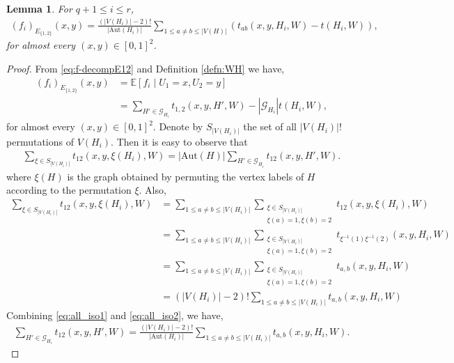 \documentclass[11pt,reqno]{amsart}
\numberwithin{equation}{section}
\newcommand\Aut{\mathrm{Aut}}
\newtheorem{lemma}{Lemma}[section]
\theoremstyle{definition}
\begin{document}
\begin{lemma}\label{lemma:f_E12-expression}
For $q+1\leq i\leq r$,
\begin{align*}
    (f_{i})_{E_{\{1,2\}}}(x,y) = \frac{(|V(H_{i})|-2)!}{|\Aut(H_{i})|}\sum_{1 \leq a\neq b \leq |V(H)|}\left(t_{ab}(x,y,H_{i},W) - t(H_{i},W)\right) , 
\end{align*}
for almost every $(x,y)\in [0,1]^{2}$.
\end{lemma}
\begin{proof}
From \eqref{eq:f-decompE12} and Definition \ref{defn:WH} we have,  
\begin{align}\label{eq:f_E12-1}
    (f_{i})_{E_{\{1,2\}}}(x,y)
    & = \mathbb{E}\left[f_{i}\middle| U_{1}=x,U_{2}=y\right]\nonumber\\
    & = \sum_{H'\in \mathscr{G}_{H_{i}}}t_{1,2}\left(x,y,H',W\right) - |\mathscr{G}_{H_{i}}|t(H_{i},W) , 
\end{align}
for almost every $(x,y)\in [0,1]^2$. Denote by $S_{|V(H_{i})|}$ the set of all $|V(H_{i})|!$ permutations of $V(H_{i})$. 
Then it is easy to observe that 
\begin{align}\label{eq:all_iso1}
    \sum_{\xi\in S_{|V(H_{i})|}}t_{12}(x,y,\xi(H_{i}),W)=|\Aut(H)|\sum_{H'\in\mathscr{G}_{H_{i}}}t_{12}(x,y,H',W).
\end{align}
where $\xi(H)$ is the graph obtained by permuting the vertex labels of $H$ according to the permutation $\xi$. Also,
\begin{align}
    \sum_{\xi\in S_{|V(H_{i})|}}t_{12}(x,y,\xi(H_{i}),W)
    &=\sum_{1\leq a\neq b\leq |V(H_{i})|}\sum_{\substack{\xi\in S_{|V(H_{i})|}\\\xi(a)=1,\xi(b)=2}}t_{12}(x,y,\xi(H_{i}),W)\nonumber\\
    &=\sum_{1\leq a\neq b\leq |V(H_{i})|}\sum_{\substack{\xi\in S_{|V(H_{i})|}\\\xi(a)=1,\xi(b)=2}}t_{\xi^{-1}(1)\xi^{-1}(2)}(x,y,H_{i},W)\nonumber\\
    &=\sum_{1\leq a\neq b\leq |V(H_{i})|}\sum_{\substack{\xi\in S_{|V(H_{i})|}\\\xi(a)=1,\xi(b)=2}}t_{a, b}(x,y,H_{i},W)\nonumber\\
    &=(|V(H_{i})|-2)!\sum_{1\leq a\neq b\leq |V(H_{i})|}t_{a,b}(x,y,H_{i},W)\label{eq:all_iso2}
\end{align}
Combining \eqref{eq:all_iso1} and \eqref{eq:all_iso2}, we have,
\begin{align}\label{eq:WH_alt}
    \sum_{H'\in\mathscr{G}_{H_{i}}}t_{12}(x,y,H',W)=\frac{(|V(H_{i})|-2)!}{|\Aut(H_{i})|}\sum_{1\leq a\neq b\leq |V(H_{i})|}t_{a, b}(x,y,H_{i},W).

\end{align}
\end{proof}
\end{document}
